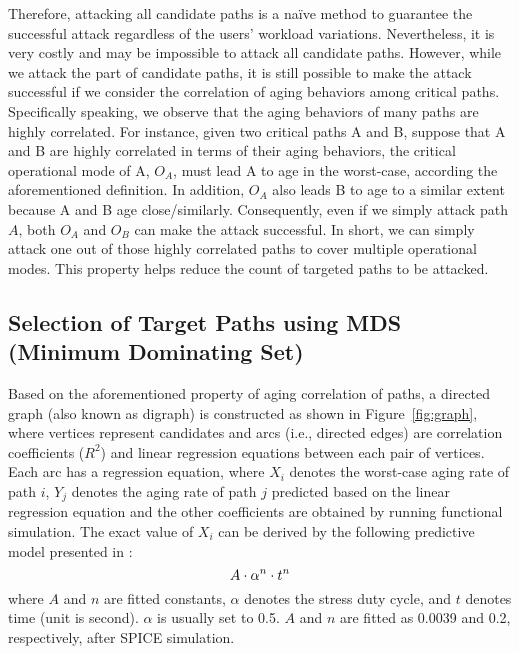 Therefore, attacking all candidate paths is a na\"ive method to guarantee the successful attack regardless of the users' workload variations. Nevertheless, it is very costly and may be impossible to attack all candidate paths. 
However, while we attack the part of candidate paths, it is still possible to make the attack successful if we consider the correlation of aging behaviors among critical paths. Specifically speaking, we observe that the aging behaviors of many paths are highly correlated. For instance, given two critical paths A and B, suppose that A and B are highly correlated in terms of their aging behaviors, the critical operational mode of A, $O_{A}$, must lead A to age in the worst-case, according the aforementioned definition. In addition, $O_{A}$ also leads B to age to a similar extent because A and B age close/similarly. Consequently, even if we simply attack path $A$, both $O_{A}$ and  $O_{B}$ can make the attack successful. In short, we can simply attack one out of those highly correlated paths to cover multiple operational modes. This property helps reduce the count of targeted paths to be attacked.%

\subsection{Selection of Target Paths using MDS (Minimum Dominating Set)}
\label{sec:frame:mds}
Based on the aforementioned property of aging correlation of paths, a directed graph (also known as digraph) is constructed as shown in Figure~\ref{fig:graph}, where vertices represent candidates and arcs (i.e., directed edges) are correlation coefficients ($R^2$) and linear regression equations between each pair of vertices. Each arc has a regression equation, where $X_{i}$ denotes the worst-case aging rate of path $i$, $Y_{j}$ denotes the aging rate of path $j$ predicted based on the linear regression equation and the other coefficients are obtained by running functional simulation. The exact value of $X_{i}$ can be derived by the following predictive model presented in \cite{wang2007efficient}:
\begin{equation}
	\fontsize{8}{8} \selectfont
	A \cdot \alpha^n \cdot t^n 
	\label{eq:worst}
\end{equation}
where $A$ and $n$ are fitted constants, $\alpha$ denotes the stress duty cycle, and $t$ denotes time (unit is second). $\alpha$ is usually set to 0.5. $A$ and $n$ are fitted as 0.0039 and 0.2, respectively, after SPICE simulation.

